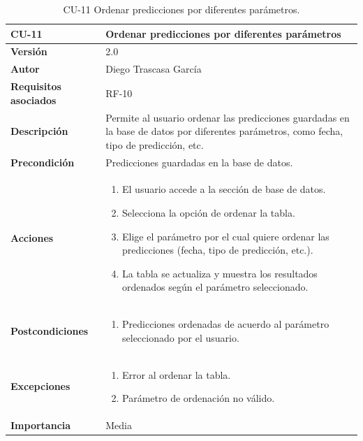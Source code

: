 \begin{table}[p]
	\centering
	\begin{tabularx}{\linewidth}{ p{} p{} }
		\toprule
		\textbf{CU-11}    & \textbf{Ordenar predicciones por diferentes parámetros}\\
		\toprule
		\textbf{Versión}              & 2.0    \\
		\textbf{Autor}                & Diego Trascasa García \\
		\textbf{Requisitos asociados} & RF-10 \\
		\textbf{Descripción}          & Permite al usuario ordenar las predicciones guardadas en la base de datos por diferentes parámetros, como fecha, tipo de predicción, etc. \\
		\textbf{Precondición}         & Predicciones guardadas en la base de datos. \\
		\textbf{Acciones}             &
		\begin{enumerate}
			\item El usuario accede a la sección de base de datos.
			\item Selecciona la opción de ordenar la tabla.
			\item Elige el parámetro por el cual quiere ordenar las predicciones (fecha, tipo de predicción, etc.).
			\item La tabla se actualiza y muestra los resultados ordenados según el parámetro seleccionado.
		\end{enumerate}\\
		\textbf{Postcondiciones}      & 
		\begin{enumerate}
			\item Predicciones ordenadas de acuerdo al parámetro seleccionado por el usuario.
		\end{enumerate}\\
		\textbf{Excepciones}          & 
		\begin{enumerate}
			\item Error al ordenar la tabla.
			\item Parámetro de ordenación no válido.
		\end{enumerate}\\
		\textbf{Importancia}          & Media \\
		\bottomrule
	\end{tabularx}
	\caption{CU-11 Ordenar predicciones por diferentes parámetros.}
    \label{CU-11}
\end{table}

